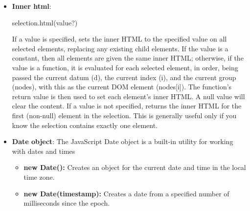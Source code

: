 \documentclass{report}
\begin{document}
\begin{itemize}
            \bigbreak \noindent 
            \begin{jscode}
            selection.text(value?)
            \end{jscode}
            \bigbreak \noindent 
            If a value is specified, sets the text content to the specified value on all selected elements, replacing any existing child elements. If the value is a constant, then all elements are given the same text content; otherwise, if the value is a function, it is evaluated for each selected element, in order, being passed the current datum (d), the current index (i), and the current group (nodes), with this as the current DOM element (nodes[i]). The function’s return value is then used to set each element’s text content. A null value will clear the content.
            \bigbreak \noindent 
            If a value is not specified, returns the text content for the first (non-null) element in the selection. This is generally useful only if you know the selection contains exactly one element.
        \item \textbf{Inner html}: 
            \bigbreak \noindent 
            \begin{jscode}
            selection.html(value?)
            \end{jscode}
            \bigbreak \noindent 
            If a value is specified, sets the inner HTML to the specified value on all selected elements, replacing any existing child elements. If the value is a constant, then all elements are given the same inner HTML; otherwise, if the value is a function, it is evaluated for each selected element, in order, being passed the current datum (d), the current index (i), and the current group (nodes), with this as the current DOM element (nodes[i]). The function’s return value is then used to set each element’s inner HTML. A null value will clear the content.
            \bigbreak \noindent 
            If a value is not specified, returns the inner HTML for the first (non-null) element in the selection. This is generally useful only if you know the selection contains exactly one element.
        \item \textbf{Date object}: The JavaScript Date object is a built-in utility for working with dates and times
            \begin{itemize}
                \item \textbf{new Date():} Creates an object for the current date and time in the local time zone.
                \item \textbf{new Date(timestamp):} Creates a date from a specified number of milliseconds since the epoch.

\end{itemize}
\end{itemize}
\end{document}
